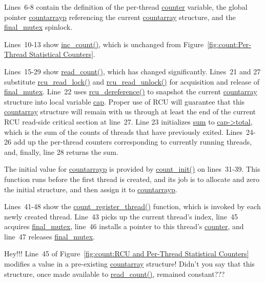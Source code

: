 Lines~6-8 contain the definition of the per-thread \url{counter}
variable, the global pointer \url{countarrayp} referencing
the current \url{countarray} structure, and
the \url{final_mutex} spinlock.

Lines~10-13 show \url{inc_count()}, which is unchanged from
Figure~\ref{fig:count:Per-Thread Statistical Counters}.

Lines~15-29 show \url{read_count()}, which has changed significantly.
Lines~21 and 27 substitute \url{rcu_read_lock()} and
\url{rcu_read_unlock()} for acquisition and release of \url{final_mutex}.
Line~22 uses \url{rcu_dereference()} to snapshot the
current \url{countarray} structure into local variable \url{cap}.
Proper use of RCU will guarantee that this \url{countarray} structure
will remain with us through at least the end of the current RCU
read-side critical section at line~27.
Line 23 initializes \url{sum} to \url{cap->total}, which is the
sum of the counts of threads that have previously exited.
Lines~24-26 add up the per-thread counters corresponding to currently
running threads, and, finally, line 28 returns the sum.

The initial value for \url{countarrayp} is
provided by \url{count_init()} on lines~31-39.
This function runs before the first thread is created, and its job
is to allocate
and zero the initial structure, and then assign it to \url{countarrayp}.

Lines~41-48 show the \url{count_register_thread()} function, which
is invoked by each newly created thread.
Line~43 picks up the current thread's index, line~45 acquires
\url{final_mutex}, line~46 installs a pointer to this thread's
\url{counter}, and line~47 releases \url{final_mutex}.

\QuickQuiz{}
	Hey!!!
	Line~45 of
	Figure~\ref{fig:count:RCU and Per-Thread Statistical Counters}
	modifies a value in a pre-existing \url{countarray} structure!
	Didn't you say that this structure, once made available to
	\url{read_count()}, remained constant???
 \QuickQuizEnd

